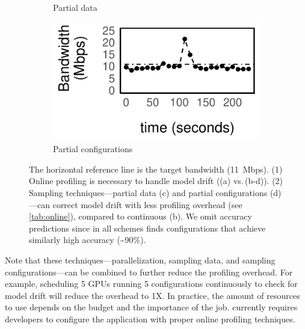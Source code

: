 \begin{figure}
\begin{subfigure}[t]{0.45\columnwidth}
    \caption{Partial data}
    \label{fig:online-partial}
  \end{subfigure}
  \hfill
  \begin{subfigure}[t]{0.45\columnwidth}
    \includegraphics[width=\textwidth]{figures/online4.pdf}
    \caption{Partial configurations}
    \label{fig:online-trigger}
  \end{subfigure}
  \caption{The horizontal reference line is the target bandwidth
    (\SI{11}{Mbps}). (1) Online profiling is necessary to handle model drift
    ((a) vs.\,(b-d)). (2) Sampling techniques---partial data (c) and partial
    configurations (d)---can correct model drift with less profiling overhead
    (see \autoref{tab:online}), compared to continuous (b).  We omit accuracy
    predictions since in all schemes \sysname{} finds configurations that
    achieve similarly high accuracy (\textasciitilde 90\%).  }
  \label{fig:online-tricks}
  \vspace{-0.5em}
\end{figure}


Note that these techniques---parallelization, sampling data, and sampling
configurations---can be combined to further reduce the profiling overhead. For
example, scheduling 5 GPUs running 5 configurations continuously to check for
model drift will reduce the overhead to 1X\@. In practice, the amount of
resources to use depends on the budget and the importance of the job. \sysname{}
currently requires developers to configure the application with proper online
profiling techniques.


